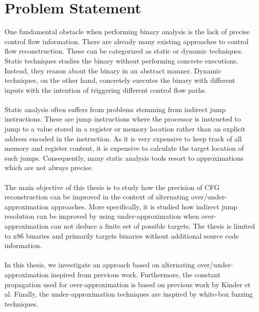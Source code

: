 \documentclass{kththesis}
\begin{document}
\section{Problem Statement}
One fundamental obstacle when performing binary analysis is the lack of precise control flow information. There are already many existing approaches to control flow reconstruction. These can be categorized as static or dynamic techniques. Static techniques studies the binary without performing concrete executions. Instead, they reason about the binary in an abstract manner. Dynamic techniques, on the other hand, concretely executes the binary with different inputs with the intention of triggering different control flow paths. 
\\ \\ 
Static analysis often suffers from problems stemming from indirect jump instructions. These are jump instructions where the processor is instructed to jump to a value stored in a register or memory location rather than an explicit address encoded in the instruction. As it is very expensive to keep track of all memory and register content, it is expensive to calculate the target location of such jumps. Consequently, many static analysis tools resort to approximations which are not always precise.
\\ \\
The main objective of this thesis is to study how the precision of CFG reconstruction can be improved in the context of alternating over/under-approximation approaches. More specifically, it is studied how indirect jump resolution can be improved by using under-approximation when over-approximation can not deduce a finite set of possible targets. The thesis is limited to x86 binaries and primarily targets binaries without additional source code information.
\\ \\
In this thesis, we investigate an approach based on alternating over/under-approximation inspired from previous work\cite{alternating}. Furthermore, the constant propagation used for over-approximation is based on previous work by Kinder et al\cite{Jakstab}. Finally, the under-approximation techniques are inspired by white-box fuzzing techniques.
\end{document}
